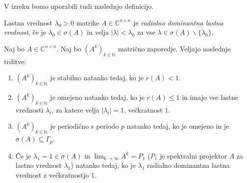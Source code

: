 \documentclass[mat1]{fmfdelo}
\newcommand{\N}{\mathbb N}
\newcommand{\C}{\mathbb C}
\begin{document}
V izreku bomo uporabili tudi naslednjo definicijo.
\begin{definicija}
    Lastna vrednost $\lambda_0 > 0$ matrike $A \in \C^{n \times n}$ je \emph{radialno dominantna lastna vrednost}, če je $\lambda_0 \in \sigma(A)$ in velja $|\lambda| < \lambda_0$ za vse $\lambda \in \sigma(A) \backslash \{\lambda_0\}$.
\end{definicija}
\begin{izrek}\label{izrekAsimptotika}
    Naj bo $A \in \C^{n \times n}$. Naj bo $(A^k)_{k\in\N}$ matrično zaporedje. Veljajo naslednje trditve:
    \begin{enumerate}
        \item $(A^k)_{k\in\N}$ je stabilno natanko tedaj, ko je $r(A) < 1$.
        \item $(A^k)_{k\in\N}$ je omejeno natanko tedaj, ko je $r(A) \leq 1$ in imajo vse lastne vrednosti $\lambda_i$, za katere velja $|\lambda_i| = 1$, večkratnost $1$.
        \item $(A^k)_{k\in\N}$ je periodično s periodo $p$ natanko tedaj, ko je omejeno in je $\sigma(A) \subseteq \Gamma_p$.
        \item Če je $\lambda_1 = 1 \in \sigma(A)$ in $\lim_{k\rightarrow\infty} A^k = P_1$ ($P_1$ je spektralni projektor $A$ za lastno vrednost $\lambda_1$) natanko tedaj, ko je $\lambda_1$ radialno dominantna lastna vrednost z večkratnostjo $1$.
    \end{enumerate}
\end{izrek}
\end{document}

